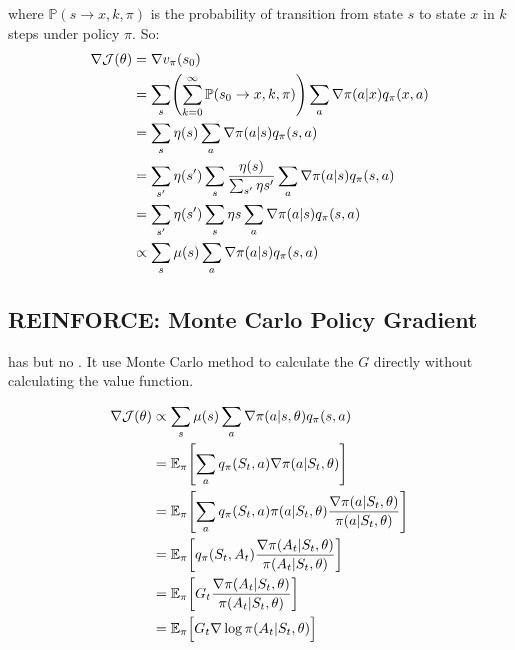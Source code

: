 where $\mathbb{P}(s \rightarrow x, k, \pi )$ is the probability of transition from state $s$ to state $x$ in $k$ steps under policy $\pi$. So:
\begin{equation}
	\begin{aligned}
		\nabla \mathcal{J}(\theta ) &= \nabla v_\pi(s_0) \\
		&= \sum_{s} \mleft( \sum_{k=0}^\infty \mathbb{P}(s_0 \rightarrow x, k, \pi ) \mright) \sum_a \nabla \pi(a|x) q_\pi(x,a) \\
		&= \sum_s \eta(s) \sum_a \nabla \pi(a|s) q_\pi(s,a) \\
		&= \sum_{s'} \eta(s') \sum_s \frac{\eta(s)}{\sum_{s'} \eta{s'}} \sum_a \nabla \pi(a|s) q_\pi(s,a) \\
		&= \sum_{s'} \eta(s') \sum_s \eta{s} \sum_a \nabla \pi(a|s) q_\pi(s,a) \\
		&\propto \sum_s \mu(s) \sum_a \nabla \pi(a|s) q_\pi(s,a)
	\end{aligned}
\end{equation}

\subsection{REINFORCE: Monte Carlo Policy Gradient}

 has  but no . It use Monte Carlo method to calculate the $G$ directly without calculating the value function.

\begin{equation}
	\begin{aligned}
		\nabla \mathcal{J}(\theta ) &\propto \sum_s \mu(s) \sum_a \nabla \pi(a|s,\mathbb{\theta} ) q_\pi(s,a) \\
		&= \mathbb{E}_\pi \mleft[ \sum_a q_\pi(S_t,a) \nabla \pi(a|S_t,\mathbb{\theta}) \mright] \\
		&= \mathbb{E}_\pi \mleft[ \sum_a q_\pi(S_t,a) \pi(a|S_t,\theta) \frac{\nabla \pi(a|S_t,\mathbb{\theta})}{\pi(a|S_t,\mathbb{\theta})} \mright] \\
		&= \mathbb{E}_\pi \mleft[ q_\pi(S_t,A_t) \frac{\nabla \pi(A_t|S_t,\mathbb{\theta})}{\pi(A_t|S_t,\mathbb{\theta})} \mright] \\
		&= \mathbb{E}_\pi \mleft[ G_t \frac{\nabla \pi(A_t|S_t,\mathbb{\theta})}{\pi(A_t|S_t,\mathbb{\theta})} \mright] \\
		&= \mathbb{E}_\pi \Big[ G_t \nabla \log \pi(A_t|S_t,\mathbb{\theta}) \Big] 
	\end{aligned}
\end{equation}

